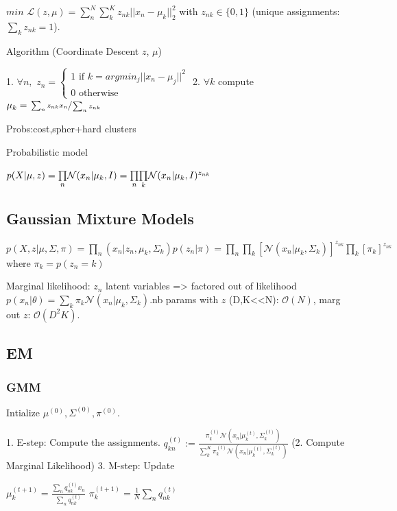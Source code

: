 $min\,\,\mathcal{L}(z,\mu) = \sum_n^N \sum_k^K z_{nk} ||x_n - \mu_k||^2_2$ with $z_{nk} \in \{0,1\}$ (unique assignments: $\sum_k z_{nk} = 1$).

Algorithm (Coordinate Descent $z$, $\mu$)

1. $\forall n,$ $z_n = \begin{cases}
	1 \text{ if } k = argmin_j || x_n - \mu_j||^2 \\
	0 \text{ otherwise }
   \end{cases}$
2. $\forall k$ compute $\mu_k = \sfrac{\sum_n z_{nk} x_n}{\sum_n z_{nk}}$

Probs:cost,spher+hard clusters

Probabilistic model

$p(X|\mu,z) = \underset{n}{\prod}  \mathcal{N}(x_n|\mu_k,I) \newline= \underset{n}{\prod} \underset{k}{\prod}  \mathcal{N}(x_n|\mu_k,I)^{z_{nk}}$

\subsection{Gaussian Mixture Models}
$p(X,z|\mu,\Sigma,\pi) = \underset{n}{\prod} (x_n|z_n,\mu_k,\Sigma_k)p(z_n|\pi)
= \underset{n}{\prod}\underset{k}{\prod} [\mathcal{N}(x_n|\mu_k,\Sigma_k)]^{z_{nk}} \underset{k}{\prod} [\pi_k]^{z_{nk}}$ \newline where $\pi_k = p(z_n=k)$

Marginal likelihood: $z_n$ latent variables => factored out of likelihood \newline $p(x_n|\theta) = \sum_k \pi_k \mathcal{N}(x_n|\mu_k, \Sigma_k)$.\newline nb params with $z$ (D,K<<N): $\mathcal{O}(N)$, marg out $z$: $\mathcal{O}(D^2K)$.

\subsection{EM}
\subsubsection{GMM}
Intialize $\mu^{(0)}, \Sigma^{(0)}, \pi^{(0)}$.

1. E-step: Compute the assignments. $q_{kn}^{(t)} := \frac{\pi_k^{(t)} \mathcal{N}(x_n|\mu_k^{(t)}, \Sigma_k^{(t)})}{ \sum_k^K\pi_k^{(t)} \mathcal{N}(x_n|\mu_k^{(t)}, \Sigma_k^{(t)}) }$
(2. Compute Marginal Likelihood)
3. M-step: Update

$\mu_k^{(t+1)} = \frac{\underset{n}{\sum} q_{nk}^{(t)} x_n}{\underset{n}{\sum} q_{nk}^{(t)}}$ $\pi_k^{(t+1)} = \frac{1}{N} \underset{n}{\sum} q_{nk}^{(t)}$

